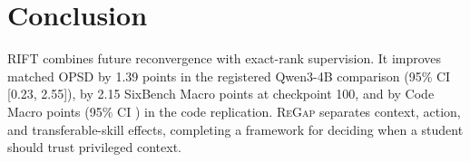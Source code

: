 \documentclass[letterpaper]{article}
\newcommand{\RIFT}{\textsc{RIFT}}
\newcommand{\ReGap}{\textsc{ReGap}}
\begin{document}
\section{Conclusion}

\RIFT{} combines future reconvergence with exact-rank supervision. It improves
matched OPSD by 1.39 points in the registered Qwen3-4B comparison (95\% CI
[0.23, 2.55]), by 2.15 SixBench Macro points at checkpoint 100, and by
\CodeRiftVsMatchedDelta{} Code Macro points (95\% CI
\CodeRiftVsMatchedCI{}) in the code replication. \ReGap{} separates context,
action, and transferable-skill effects, completing a framework for deciding
when a student should trust privileged context.


\end{document}
